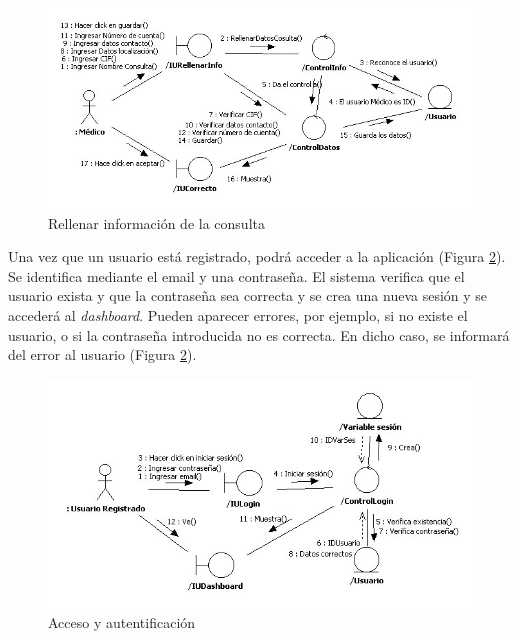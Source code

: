 \documentclass[a4paper,oneside,11pt]{book}
\begin{document}
			\begin{figure}[H]
			  \centering
			    \includegraphics[width=16cm]{img/jpg/colaboraciones/21_RellenarInfoConsulta.jpg}
			  \caption{Rellenar información de la consulta}
			  \label{fig:col_rellenarinfo_consulta}
			\end{figure}
			
			\newpage
			Una vez que un usuario está registrado, podrá acceder a la aplicación (Figura \ref{fig:col_acc_y_aut}). Se identifica mediante el email y una contraseña. El sistema verifica que el usuario exista y que la contraseña sea correcta y se crea una nueva sesión y se accederá al \textit{dashboard}. Pueden aparecer errores, por ejemplo, si no existe el usuario, o si la contraseña introducida no es correcta. En dicho caso, se informará del error al usuario (Figura \ref{fig:col_acc_y_aut}).
			
			\begin{figure}[H]
			  \centering
			    \includegraphics[width=16cm]{img/jpg/colaboraciones/23_Accesoyautentificacion.jpg}
			  \caption{Acceso y autentificación}
			  \label{fig:col_acc_y_aut}
			\end{figure}
			
\end{document}

